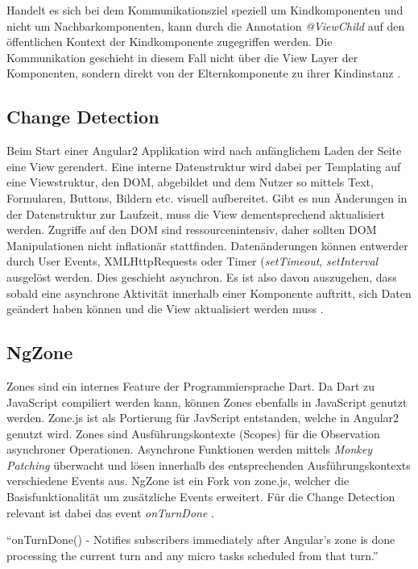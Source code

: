 Handelt es sich bei dem Kommunikationsziel speziell um Kindkomponenten und nicht um Nachbarkomponenten,
kann durch die Annotation \emph{@ViewChild} auf den öffentlichen Kontext der Kindkomponente zugegriffen werden.
Die Kommunikation geschieht in diesem Fall nicht über die View Layer der Komponenten,
sondern direkt von der Elternkomponente zu ihrer Kindinstanz \cite{ViewC61:online}.


\subsection{Change Detection}
\label{sec:change-detection}

Beim Start einer Angular2 Applikation wird nach anfänglichem Laden der Seite eine View gerendert.
Eine interne Datenstruktur wird dabei per Templating auf eine Viewstruktur, den DOM, abgebildet und dem Nutzer so mittels Text,
Formularen, Buttons, Bildern etc. visuell aufbereitet.
Gibt es nun Änderungen in der Datenstruktur zur Laufzeit, muss die View dementsprechend aktualisiert werden.
Zugriffe auf den DOM sind ressourcenintensiv, daher sollten DOM Manipulationen nicht inflationär stattfinden.
Datenänderungen können entwerder durch User Events, XMLHttpRequests oder Timer (\emph{setTimeout}, \emph{setInterval} ausgelöst werden.
Dies geschieht asynchron. Es ist also davon auszugehen, dass sobald eine asynchrone Aktivität innerhalb einer Komponente auftritt,
sich Daten geändert haben können und die View aktualisiert werden muss \cite{changedetection-explained}.

\subsection{NgZone}

Zones sind ein internes Feature der Programmiersprache Dart. Da Dart zu JavaScript compiliert werden kann,
können Zones ebenfalls in JavaScript genutzt werden. Zone.js ist als Portierung für JavScript entstanden, welche in Angular2 genutzt wird.
Zones sind Ausführungskontexte (Scopes) für die Observation asynchroner Operationen.
Asynchrone Funktionen werden mittels \emph{Monkey Patching} überwacht und lösen innerhalb des entsprechenden Ausführungskontexts verschiedene Events aus.
NgZone ist ein Fork von zone.js, welcher die Basisfunktionalität um zusätzliche Events erweitert.
Für die Change Detection relevant ist dabei das event \emph{onTurnDone} \cite{changedetection-explained}.

\vspace{0.3cm}
``onTurnDone() - Notifies subscribers immediately after Angular’s zone is done processing the current turn and any micro tasks scheduled from that turn.''
\cite{ZONESINANGULAR2}
\vspace{0.3cm}

